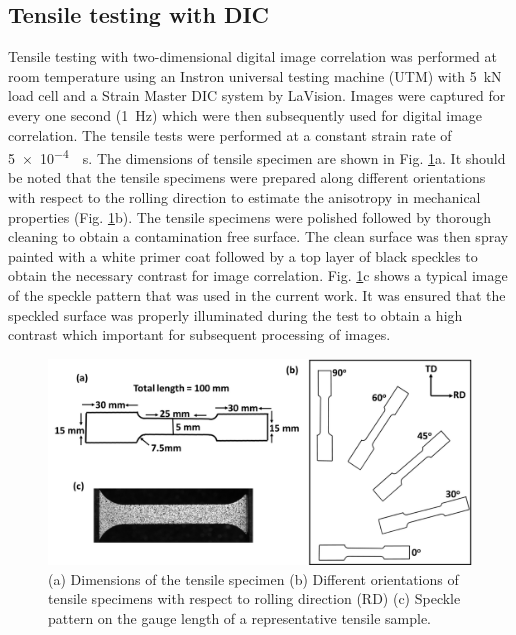 \documentclass[11pt]{article} %
\begin{document}
\subsection{Tensile testing with DIC}
Tensile testing with two-dimensional digital image correlation was performed at room temperature using an Instron universal testing machine (UTM) with \SI{5}{\kilo\newton} load cell and a Strain Master DIC system by LaVision. Images were captured for every one second (\SI{1}{\hertz}) which were then subsequently used for digital image correlation. The tensile tests were performed at a constant strain rate of \SI{5e-4}{\per\second}. The dimensions of tensile specimen are shown in Fig. \ref{fig:dic_specimens}a. It should be noted that the tensile specimens were prepared along different orientations with respect to the rolling direction to estimate the anisotropy in mechanical properties (Fig. \ref{fig:dic_specimens}b). The tensile specimens were polished followed by thorough cleaning to obtain a contamination free surface. The clean surface was then spray painted with a white primer coat followed by a top layer of black speckles to obtain the necessary contrast for image correlation. Fig. \ref{fig:dic_specimens}c shows a typical image of the speckle pattern that was used in the current work. It was ensured that the speckled surface was properly illuminated during the test to obtain a high contrast which important for subsequent processing of images.

\begin{figure}[h]
	\includegraphics[width=\textwidth]{figures/dic_specimens}
	\centering
	\caption{(a) Dimensions of the tensile specimen (b) Different orientations of tensile specimens with respect to rolling direction (RD) (c) Speckle pattern on the gauge length of a representative tensile
 sample.
	\label{fig:dic_specimens}}
\end{figure}
\end{document}
